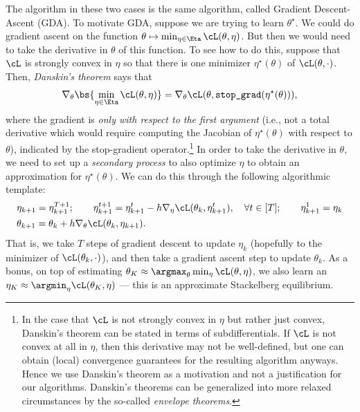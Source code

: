 \documentclass[../../book-main.tex]{subfiles}
\begin{document}
The algorithm in these two cases is the same algorithm, called
Gradient Descent-Ascent (GDA). To motivate GDA, suppose we are trying
to learn \(\theta^{\star}\). We could do gradient ascent on the
function \(\theta \mapsto \min_{\eta \in \Eta}\cL(\theta, \eta)\).
But then we would need to take the derivative in \(\theta\) of this
function. To see how to do this, suppose that \(\cL\) is strongly
convex in \(\eta\) so that there is one minimizer
\(\eta^{\star}(\theta)\) of \(\cL(\theta, \cdot)\). Then,
\textit{Danskin's theorem} says that
\begin{equation}
    \nabla_{\theta}\bs{\min_{\eta \in \Eta}\cL(\theta, \eta)} =
    \nabla_{\theta}\cL(\theta, \texttt{stop\_grad}(\eta^{\star}(\theta))),
\end{equation}
where the gradient is \textit{only with respect to the first
argument} (i.e., not a total derivative which would require computing
the Jacobian of \(\eta^{\star}(\theta)\) with respect to \(\theta\)),
indicated by the stop-gradient operator.\footnote{In the case that
    \(\cL\) is not strongly convex in \(\eta\) but rather just convex,
    Danskin's theorem can be stated in terms of subdifferentials. If
    \(\cL\) is not convex at all in \(\eta\), then this derivative may
    not be well-defined, but one can obtain (local) convergence
    guarantees for the resulting algorithm anyways. Hence we use
    Danskin's theorem as a motivation and not a justification for our
    algorithms. Danskin's theorems can be generalized into more relaxed
circumstances by the so-called \textit{envelope theorems}.}
In order to take the derivative in \(\theta\), we need to set up a
\textit{secondary process} to also optimize \(\eta\) to obtain an
approximation for \(\eta^{\star}(\theta)\). We can do this through
the following algorithmic template:
\begin{align}
    &\eta_{k + 1} = \eta_{k + 1}^{T + 1}; \qquad \eta_{k + 1}^{t + 1}
    = \eta_{k + 1}^{t} - h \nabla_{\eta} \cL(\theta_{k}, \eta_{k +
    1}^{t}), \quad \forall t \in [T]; \qquad \eta_{k + 1}^{1} = \eta_{k} \\
    &\theta_{k + 1} = \theta_{k} + h \nabla_{\theta}\cL(\theta_{k},
    \eta_{k + 1}).
\end{align}
That is, we take \(T\) steps of gradient descent to update
\(\eta_{k}\) (hopefully to the minimizer of \(\cL(\theta_{k},
\cdot)\)), and then take a gradient ascent step to update
\(\theta_{k}\). As a bonus, on top of estimating \(\theta_{K} \approx
\argmax_{\theta}\min_{\eta}\cL(\theta, \eta)\), we also learn an
\(\eta_{K} \approx \argmin_{\eta}\cL(\theta_{K}, \eta)\) --- this is
an approximate Stackelberg equilibrium.
\end{document}
